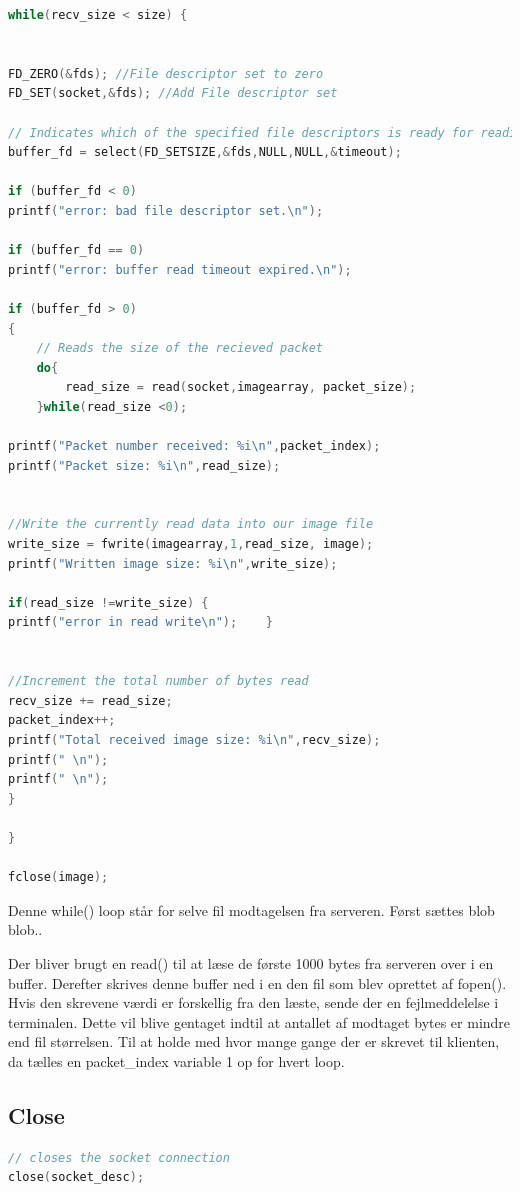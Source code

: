 \documentclass[12pt,fleqn,a4paper]{report}
\begin{document}
\begin{framed}
\begin{lstlisting}[language=C++]
while(recv_size < size) {
	
	
FD_ZERO(&fds); //File descriptor set to zero
FD_SET(socket,&fds); //Add File descriptor set
	
// Indicates which of the specified file descriptors is ready for reading, writing, or has an error condition pending
buffer_fd = select(FD_SETSIZE,&fds,NULL,NULL,&timeout);
	
if (buffer_fd < 0)
printf("error: bad file descriptor set.\n");
	
if (buffer_fd == 0)
printf("error: buffer read timeout expired.\n");
	
if (buffer_fd > 0)
{
	// Reads the size of the recieved packet
	do{
		read_size = read(socket,imagearray, packet_size);
	}while(read_size <0);
	
printf("Packet number received: %i\n",packet_index);
printf("Packet size: %i\n",read_size);
	
	
//Write the currently read data into our image file
write_size = fwrite(imagearray,1,read_size, image);
printf("Written image size: %i\n",write_size);

if(read_size !=write_size) {
printf("error in read write\n");    }
	
	
//Increment the total number of bytes read
recv_size += read_size;
packet_index++;
printf("Total received image size: %i\n",recv_size);
printf(" \n");
printf(" \n");
}

}

fclose(image);
\end{lstlisting}
\end{framed}

Denne while() loop står for selve fil modtagelsen fra serveren. Først sættes blob blob..

Der bliver brugt en read() til at læse de første 1000 bytes fra serveren over i en buffer. Derefter skrives denne buffer ned i en den fil som blev oprettet af fopen(). Hvis den skrevene værdi er forskellig fra den læste, sende der en fejlmeddelelse i terminalen. Dette vil blive gentaget indtil at antallet af modtaget bytes er mindre end fil størrelsen.
Til at holde med hvor mange gange der er skrevet til klienten, da tælles en packet_index variable 1 op for hvert loop.

\subsection{Close}
\begin{framed}
\begin{lstlisting}[language=C++]
// closes the socket connection
close(socket_desc);
\end{lstlisting}
\end{framed}
\end{document}
